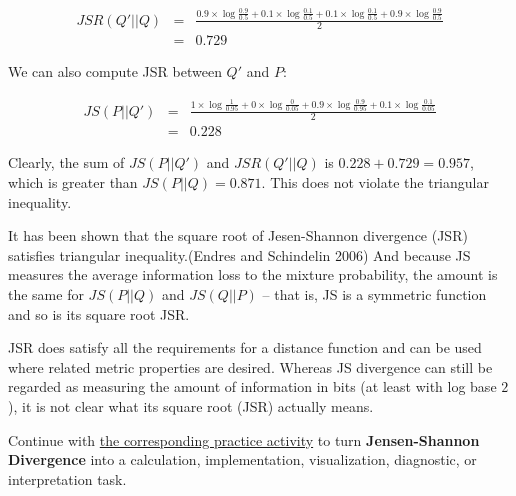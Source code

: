 \documentclass[
  letterpaper,
]{scrbook}
\begin{document}
\[\begin{aligned}
  JSR(Q'||Q)
  & = & \frac{0.9\times\log\frac{0.9}{0.5} + 0.1\times\log\frac{0.1}{0.5} + 0.1\times\log\frac{0.1}{0.5} + 0.9\times\log\frac{0.9}{0.5}}{2} \\
  & = & 0.729
\end{aligned}\]

We can also compute JSR between \(Q'\) and \(P\):

\[\begin{aligned}
  JS(P||Q')
  & = & \frac{1\times\log\frac{1}{0.95} + 0\times\log\frac{0}{0.05} + 0.9\times\log\frac{0.9}{0.95} + 0.1\times\log\frac{0.1}{0.05}}{2} \\
  & = & 0.228
\end{aligned}\]

Clearly, the sum of \(JS(P||Q')\) and \(JSR(Q'||Q)\) is
\(0.228 + 0.729 = 0.957\), which is greater than \(JS(P||Q)=0.871\).
This does not violate the triangular inequality.

It has been shown that the square root of Jesen-Shannon divergence (JSR)
satisfies triangular inequality.(Endres and Schindelin 2006) And because
JS measures the average information loss to the mixture probability, the
amount is the same for \(JS(P||Q)\) and \(JS(Q||P)\) -- that is, JS is a
symmetric function and so is its square root JSR.

JSR does satisfy all the requirements for a distance function and can be
used where related metric properties are desired. Whereas JS divergence
can still be regarded as measuring the amount of information in bits (at
least with log base \(2\)), it is not clear what its square root (JSR)
actually means.

\begin{tcolorbox}[enhanced jigsaw, arc=.35mm, bottomrule=.15mm, bottomtitle=1mm, breakable, colback=white, colbacktitle=quarto-callout-tip-color!10!white, colframe=quarto-callout-tip-color-frame, coltitle=black, left=2mm, leftrule=.75mm, opacityback=0, opacitybacktitle=0.6, rightrule=.15mm, title=\textcolor{quarto-callout-tip-color}{\faLightbulb}\hspace{0.5em}{Put it into practice}, titlerule=0mm, toprule=.15mm, toptitle=1mm]

Continue with \hyperref[sec-pr-05-jensen-shannon-divergence]{the
corresponding practice activity} to turn \textbf{Jensen-Shannon
Divergence} into a calculation, implementation, visualization,
diagnostic, or interpretation task.

\end{tcolorbox}
\end{document}
